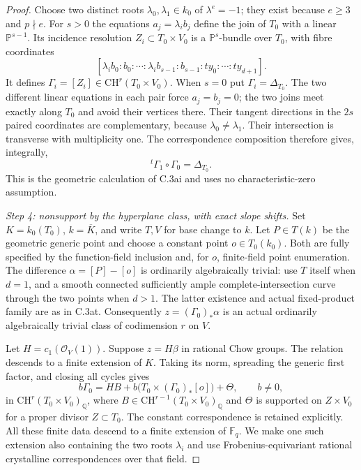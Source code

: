 \begin{proof}
Choose two distinct roots $\lambda_0,\lambda_1\in k_0$ of
$\lambda^e=-1$; they exist because $e\ge3$ and $p\nmid e$.
For $s>0$ the equations $a_j=\lambda_i b_j$ define the join
of $T_0$ with a linear $\mathbb P^{s-1}$. Its incidence resolution
$Z_i\subset T_0\times V_0$ is a $\mathbb P^s$-bundle over $T_0$,
with fibre coordinates
\[
 [\lambda_i b_0:b_0:\cdots:\lambda_i b_{s-1}:b_{s-1}:
                                  t y_0:\cdots:t y_{d+1}].
\]
It defines $\Gamma_i=[Z_i]\in\mathrm{CH}^{r}(T_0\times V_0)$.
When $s=0$ put $\Gamma_i=\Delta_{T_0}$.
The two different linear equations in each pair force $a_j=b_j=0$;
the two joins meet exactly along $T_0$ and avoid their vertices there.
Their tangent directions in the $2s$ paired coordinates are
complementary, because $\lambda_0\ne\lambda_1$. Their intersection
is transverse with multiplicity one. The correspondence composition
therefore gives, integrally,
\[
                    {}^t\Gamma_1\circ\Gamma_0=\Delta_{T_0}.
\]
This is the geometric calculation of C.3ai and uses no
characteristic-zero assumption.

\emph{Step 4: nonsupport by the hyperplane class, with exact slope shifts.}
Set $K=k_0(T_0)$, $k=\overline K$, and write $T,V$ for base change
to $k$. Let $P\in T(k)$ be the geometric generic point and choose
a constant point $o\in T_0(k_0)$. Both are fully specified by the
function-field inclusion and, for $o$, finite-field point enumeration.
The difference $\alpha=[P]-[o]$ is ordinarily algebraically trivial:
use $T$ itself when $d=1$, and a smooth connected sufficiently ample
complete-intersection curve through the two points when $d>1$.
The latter existence and actual fixed-product family are as in C.3at.
Consequently $z=(\Gamma_0)_*\alpha$ is an actual ordinarily
algebraically trivial class of codimension $r$ on $V$.

Let $H=c_1(\mathcal O_V(1))$. Suppose $z=H\beta$ in rational
Chow groups. The relation descends to a finite extension of $K$.
Taking its norm, spreading the generic first factor, and closing all
cycles gives
\[
 b\Gamma_0=H B+
       b\bigl(T_0\times(\Gamma_0)_*[o]\bigr)+\Theta,
 \qquad b\ne0,
\]
in $\mathrm{CH}^r(T_0\times V_0)_{\mathbb Q}$, where
$B\in\mathrm{CH}^{r-1}(T_0\times V_0)_{\mathbb Q}$ and
$\Theta$ is supported on $Z\times V_0$ for a proper divisor
$Z\subset T_0$. The constant correspondence is retained explicitly.
All these finite data descend to a finite extension of $\mathbb F_q$.
We make one such extension also containing the two roots
$\lambda_i$ and use Frobenius-equivariant rational crystalline
correspondences over that field.


\end{proof}
